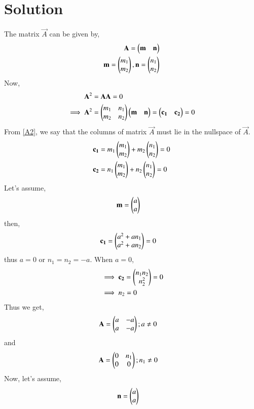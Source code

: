 \documentclass[journal,12pt,twocolumn]{IEEEtran}
\begin{document}
\section{Solution}
The matrix $\vec{A}$ can be given by, 
\begin{align}
    \mathbf{A} = \begin{pmatrix}\mathbf{m}&\mathbf{n}\end{pmatrix} \\
    \mathbf{m} = \begin{pmatrix}m_1\\m_2\end{pmatrix}, \mathbf{n} = \begin{pmatrix}n_1\\n_2\end{pmatrix}
\end{align}
Now, 
\begin{align}
    \mathbf{A}^{2} &= \mathbf{A}\mathbf{A} = 0 \\
    \implies\mathbf{A}^{2} &= \begin{pmatrix}m_1&n_1\\m_2&n_2\end{pmatrix}\begin{pmatrix}\mathbf{m}&\mathbf{n}\end{pmatrix} = \begin{pmatrix}\mathbf{c_1}&\mathbf{c_2}\end{pmatrix} = 0 \label{A2}
\end{align}
From \eqref{A2}, we say that the columns of matrix $\vec{A}$ must lie in the nullspace of $\vec{A}$.
\begin{align}
    \mathbf{c_1} &= m_1\begin{pmatrix}m_1\\m_2\end{pmatrix} + m_2\begin{pmatrix}n_1\\n_2\end{pmatrix} = 0 \\
    \mathbf{c_2} &= n_1\begin{pmatrix}m_1\\m_2\end{pmatrix} + n_2\begin{pmatrix}n_1\\n_2\end{pmatrix} = 0
\end{align}
Let's assume, 
\begin{align}
    \mathbf{m} &= \begin{pmatrix}a\\a\end{pmatrix}
\end{align}
then, 
\begin{align}
    &\mathbf{c_1} = \begin{pmatrix}a^2+an_1\\a^2+an_2\end{pmatrix}=0
\end{align}
thus $a=0$ or $n_1=n_2=-a$. When $a=0$, 
\begin{align}
    &\implies\mathbf{c_2} = \begin{pmatrix}n_1n_2\\n_2^2\end{pmatrix}=0\\
    &\implies n_2 = 0
\end{align}
Thus we get, 
\begin{align}
    \mathbf{A} &= \begin{pmatrix}a&-a\\a&-a\end{pmatrix} ; a\ne0
\end{align}
and
\begin{align}
    \mathbf{A} &= \begin{pmatrix}0&n_1\\0&0\end{pmatrix} ; n_1\ne0
\end{align}
Now, let's assume, 
\begin{align}
    \mathbf{n} &= \begin{pmatrix}a\\a\end{pmatrix}
\end{align}
\end{document}
